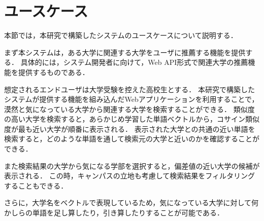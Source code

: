 \section{ユースケース}
本節では，本研究で構築したシステムのユースケースについて説明する．

まず本システムは，ある大学に関連する大学をユーザに推薦する機能を提供する．
具体的には，システム開発者に向けて，Web API形式で関連大学の推薦機能を提供するものである．

想定されるエンドユーザは大学受験を控えた高校生とする．
本研究で構築したシステムが提供する機能を組み込んだWebアプリケーションを利用することで，漠然と気になっている大学から関連する大学を検索することができる．
類似度の高い大学を検索すると，あらかじめ学習した単語ベクトルから，コサイン類似度が最も近い大学が順番に表示される．
表示された大学との共通の近い単語を検索すると，どのような単語を通して検索元の大学と近いのかを確認することができる．

また検索結果の大学から気になる学部を選択すると，偏差値の近い大学の候補が表示される．
この時，キャンパスの立地も考慮して検索結果をフィルタリングすることもできる．

さらに，大学名をベクトルで表現しているため，気になっている大学に対して何かしらの単語を足し算したり，引き算したりすることが可能である．
